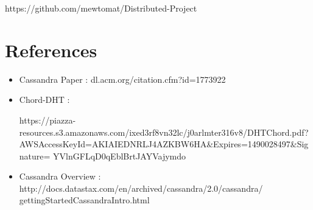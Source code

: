 \documentclass{article}
\begin{document}
https://github.com/mewtomat/Distributed-Project

\section{References}
\begin{itemize}
    \item Cassandra Paper : 
    dl.acm.org/citation.cfm?id=1773922
    \item Chord-DHT :\begin{spverbatim} https://piazza-resources.s3.amazonaws.com/ixed3rf8vn32lc/j0arlmter316v8/DHTChord.pdf?
AWSAccessKeyId=AKIAIEDNRLJ4AZKBW6HA&Expires=1490028497&Signature=
YVlnGFLqD0qEblBrtJAYVajymdo%
    \end{spverbatim}
    \item Cassandra Overview : http://docs.datastax.com/en/archived/cassandra/2.0/cassandra/
gettingStartedCassandraIntro.html
\end{itemize}
\end{document}

